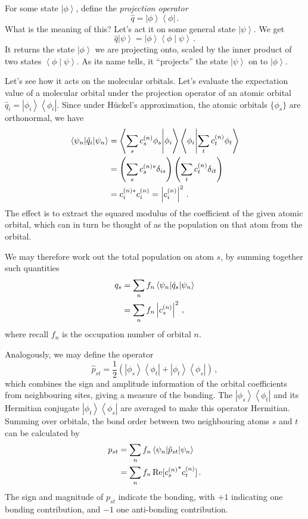 \documentclass{article}
\theoremstyle{plain}\theoremheaderfont{\normalfont\itshape}\theorembodyfont{\rmfamily}\theoremseparator{.}\newtheorem*{rem}{Remark}\newtheorem*{ex}{Example}\newtheorem*{proof}{Proof}\newtheorem*{altp}{Alternative proof}
\theoremstyle{plain}\theoremheaderfont{\normalfont\bfseries}\theorembodyfont{\rmfamily}\theoremseparator{.}\newtheorem{thm}{Theorem}[section]\newtheorem{lem}[thm]{Lemma}\newtheorem{prop}[thm]{Proposition}\newtheorem*{cor}{Corollary}\newtheorem{defn}[thm]{Definition}\newtheorem{clm}[thm]{Claim}\newtheorem{clminproof}{Claim}\newtheorem{pos}{Postulate}[section]
\theoremstyle{break}\theoremheaderfont{\normalfont\itshape}\theorembodyfont{\rmfamily}\theoremseparator{.\medskip}\newtheorem*{proofskip}{Proof}\newtheorem*{exs}{Examples}\newtheorem*{rems}{Remarks}
\theoremstyle{break}\theoremheaderfont{\normalfont\bfseries}\theorembodyfont{\rmfamily}\theoremseparator{.\medskip}\newtheorem{lemskip}[thm]{Lemma}\newtheorem{defnskip}[thm]{Definition}\newtheorem{propskip}[thm]{Proposition}\newtheorem{thmskip}[thm]{Theorem}
\numberwithin{equation}{section}
\newcommand{\bra}[1]{\left\langle #1 \right|}
\newcommand{\ket}[1]{\left| #1 \right\rangle}
\newcommand{\braket}[2]{\left\langle #1 \middle| #2 \right\rangle}
\newcommand{\expval}[2]{\left\langle #2 \middle| #1 \middle| #2 \right\rangle}
\newcommand{\abs}[1]{\left| #1 \right|}
\renewcommand{\Re}{\operatorname{Re}}
\begin{document}
    For some state \(\ket{\phi}\), define the \textit{projection operator}
    \begin{equation}
        \hat{q}=\ket{\phi}\bra{\phi}\,.
    \end{equation}
    What is the meaning of this? Let's act it on some general state \(\ket{\psi}\). We get
    \begin{equation}
        \hat{q}\ket{\psi}=\ket{\phi}\braket{\phi}{\psi}\,.
    \end{equation}
    It returns the state \(\ket{\phi}\) we are projecting onto, scaled by the inner product of two states \(\braket{\phi}{\psi}\). As its name tells, it ``projects'' the state \(\ket{\psi}\) on to \(\ket{\phi}\).

    Let's see how it acts on the molecular orbitals. Let's evaluate the expectation value of a molecular orbital under the projection operator of an atomic orbital \(\hat{q}_i=\ket{\phi_i}\bra{\phi_i}\). Since under H\"{u}ckel's approximation, the atomic orbitals \(\{\phi_s\}\) are orthonormal, we have
    \begin{align}
        \expval{\hat{q}_i}{\psi_n}&=\braket{\sum_s c_s^{(n)}\phi_s}{\phi_i}\braket{\phi_i}{\sum_t c_t^{(n)}\phi_t}\notag\\
        &=\left(\sum_s c_s^{(n)*}\delta_{is}\right)\left(\sum_t c_t^{(n)}\delta_{it}\right)\notag\\
        &=c_i^{(n)*}c_i^{(n)}=\abs{c_i^{(n)}}^2\,.
    \end{align}
    The effect is to extract the squared modulus of the coefficient of the given atomic orbital, which can in turn be thought of as the population on that atom from the orbital.

    We may therefore work out the total population on atom \(s\), by summing together such quantities
    \begin{align}
        q_s&=\sum_n f_n\expval{\hat{q}_s}{\psi_n}\notag\\
        &=\sum_n f_n\abs{c_s^{(n)}}^2\,,
    \end{align}
    where recall \(f_n\) is the occupation number of orbital \(n\).

    Analogously, we may define the operator
    \begin{equation}
        \hat{p}_{st}=\frac{1}{2}\left(\ket{\phi_s}\bra{\phi_t}+\ket{\phi_t}\bra{\phi_s}\right)\,,
    \end{equation}
    which combines the sign and amplitude information of the orbital coefficients from neighbouring sites, giving a measure of the bonding. The \(\ket{\phi_s}\bra{\phi_t}\) and its Hermitian conjugate \(\ket{\phi_t}\bra{\phi_s}\) are averaged to make this operator Hermitian. Summing over orbitals, the bond order between two neighbouring atoms \(s\) and \(t\) can be calculated by
    \begin{align}
        p_{st}&=\sum_{n}f_n\expval{\hat{p}_{st}}{\psi_n}\notag\\
        &=\sum_n f_n \Re[{c_s^{(n)}}^*c_t^{(n)}]\,.
    \end{align}
    The sign and magnitude of \(p_{st}\) indicate the bonding, with \(+1\) indicating one bonding contribution, and \(-1\) one anti-bonding contribution.
\end{document}
